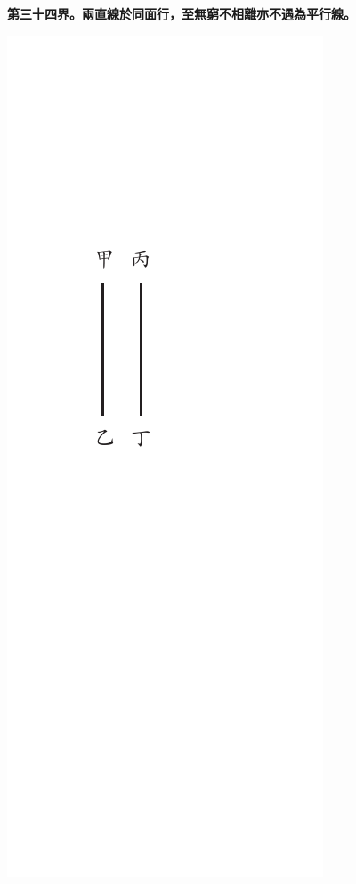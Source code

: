 \documentclass[12pt,b5paper,landscape]{article}
\newcommand{\cthm}[1]{{
\vspace{8pt}

\bfseries #1}}
\begin{document}
\begin{multicols}{2}
\cthm{第三十四界。兩直線於同面行，至無窮不相離亦不遇為平行線。}
\begin{center}
\includegraphics[angle=90]{eu24}
\end{center}


\end{multicols}
\end{document}
